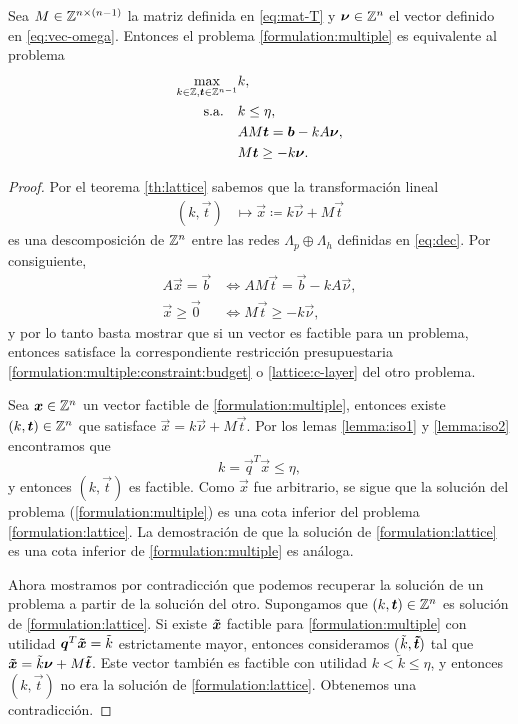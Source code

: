 \begin{theorem}
	\label{th:multeq}
	Sea $M \in \mathbb{Z}^{n \times (n - 1)}$ la matriz definida en \eqref{eq:mat-T} y $\boldsymbol{\nu} \in \mathbb{Z}^n$
	el vector definido en \eqref{eq:vec-omega}. Entonces el problema \eqref{formulation:multiple} es
	equivalente al problema
	\begin{subequations}
		\label{formulation:lattice}
		\begin{align}
			\max_{k \in \mathbb{Z}, \boldsymbol{t} \in \mathbb{Z}^{n-1}}
				& k, \\
			\text{s.a.} \quad
				& k \leq \eta, \label{lattice:c-layer} \\
				& AM\boldsymbol{t} = \boldsymbol{b} - kA\boldsymbol{\nu}, \label{lattice:constraints} \\
				& M\boldsymbol{t} \geq -k\boldsymbol{\nu}.
		\end{align}
	\end{subequations}
\end{theorem}
\begin{proof}
	Por el teorema \ref{th:lattice} sabemos que la transformación lineal
	\begin{align*}
		(k, \vec{t}) &\mapsto \vec{x} \coloneq k\vec{\nu} + M\vec{t}
	\end{align*}
	es una descomposición de $\mathbb{Z}^n$ entre las redes $\Lambda_p \oplus \Lambda_h$ definidas en
	\eqref{eq:dec}. Por consiguiente,
	\begin{align*}
		A\vec{x} = \vec{b} &\iff AM\vec{t} = \vec{b} - kA\vec{\nu}, \\
		\vec{x} \geq \vec{0} &\iff M\vec{t} \geq -k\vec{\nu},
	\end{align*}
	y por lo tanto basta mostrar que si un vector es factible para un problema, entonces satisface
	la correspondiente restricción presupuestaria \eqref{formulation:multiple:constraint:budget} o
	\eqref{lattice:c-layer} del otro problema.

	Sea $\boldsymbol{x} \in \mathbb{Z}^n$ un vector factible de \eqref{formulation:multiple}, entonces existe $(k,
	\boldsymbol{t}) \in \mathbb{Z}^n$ que satisface $\vec{x} = k\vec{\nu} + M\vec{t}$. Por los lemas \ref{lemma:iso1}
	y \ref{lemma:iso2} encontramos que
	\begin{equation*}
		k = \vec{q}^T\vec{x} \leq \eta,
	\end{equation*}
	y entonces $(k, \vec{t})$ es factible. Como $\vec{x}$ fue arbitrario, se sigue que la solución
	del problema (\ref{formulation:multiple}) es una cota inferior del problema
	\eqref{formulation:lattice}. La demostración de que la solución de \eqref{formulation:lattice}
	es una cota inferior de \eqref{formulation:multiple} es análoga.

	Ahora mostramos por contradicción que podemos recuperar la solución de un problema a partir de
	la solución del otro. Supongamos que $(k, \boldsymbol{t}) \in \mathbb{Z}^n$ es solución de
	\eqref{formulation:lattice}. Si existe $\boldsymbol{\tilde{x}}$ factible para \eqref{formulation:multiple} con
	utilidad $\boldsymbol{q}^T\boldsymbol{\tilde{x}} = \tilde{k}$ estrictamente mayor, entonces consideramos ($\tilde{k},
	\boldsymbol{\tilde{t}})$ tal que $\boldsymbol{\tilde{x}} = \tilde{k}\boldsymbol{\nu} + M\boldsymbol{\tilde{t}}$. Este vector también es factible
	con utilidad $k < \tilde{k} \leq \eta$, y entonces $(k, \vec{t})$ no era la solución de
	\eqref{formulation:lattice}. Obtenemos una contradicción.
\end{proof}

